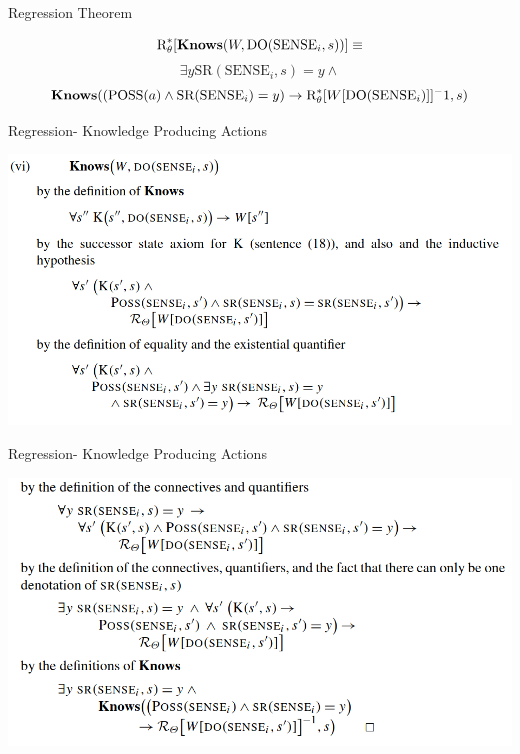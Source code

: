 \begin{frame}{Regression Theorem}

\begin{theorem}

    \[ \text{R}^*_{\theta}[\textbf{Knows}(W, \text{DO}(\text{SENSE}_i, s))] \equiv \]
    \[ \exists y \text{SR}(\text{SENSE}_i, s) = y \land \]       
    \[ \textbf{Knows}((\text{POSS}(a) \land \text{SR}(\text{SENSE}_i) = y) \rightarrow \text{R}^*_{\theta}[W[\text{DO}(\text{SENSE}_i)]]^-1, s) \]
\end{theorem}      
\end{frame}

\begin{frame}{Regression- Knowledge Producing Actions}

    \begin{center}
        \includegraphics{assets/proof1.png}
    \end{center}

\end{frame}

\begin{frame}{Regression- Knowledge Producing Actions}

    \begin{center}
        \includegraphics{assets/proof2.png}
    \end{center}

\end{frame}

